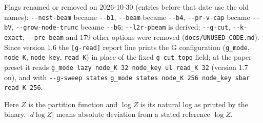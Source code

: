 \documentclass[11pt]{article}
\begin{document}
Flags renamed or removed on 2026-10-30 (entries before that date use the old names): \texttt{-{}-nest-beam} became \texttt{-{}-b1}, \texttt{-{}-beam} became \texttt{-{}-b4}, \texttt{-{}-pr-v-cap} became \texttt{-{}-bV}, \texttt{-{}-grow-node-trunc} became \texttt{-{}-bG}; \texttt{-{}-l2r-pbeam} is derived; \texttt{-{}-g-cut}, \texttt{-{}-k-exact}, \texttt{-{}-pre-beam} and 179 other options were removed (\texttt{docs/UNUSED\_CODE.md}). Since version 1.6 the \texttt{[g-read]} report line prints the G configuration (\texttt{g\_mode}, \texttt{node\_K}, \texttt{node\_key}, \texttt{read\_K}) in place of the fixed \texttt{g\_cut topq} field; at the paper preset it reads \texttt{g\_mode lazy node\_K 32 node\_key ul read\_K 32} (version 1.7 on), and with \texttt{-{}-g-sweep states} \texttt{g\_mode states node\_K 256 node\_key sbar read\_K 256}.

Here $Z$ is the partition function and $\log Z$ is its natural log as printed by the binary. $|d\log Z|$ means absolute deviation from a stated reference $\log Z$.
\end{document}
